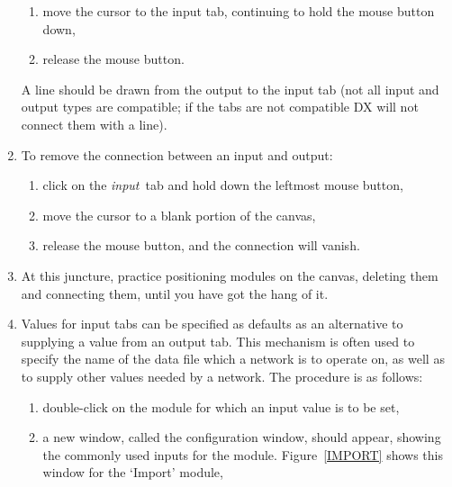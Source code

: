 \documentclass[twoside,11pt]{article}
\begin{document}
\begin{enumerate}
\begin{enumerate}
    \item move the cursor to the input tab, continuing to hold the
     mouse button down,

    \item release the mouse button.

  \end{enumerate}

   A line should be drawn from the output to the input tab (not all
   input and output types are compatible; if the tabs are not compatible
   DX will not connect them with a line).

  \item To remove the connection between an input and output:

  \begin{enumerate}

    \item click on the {\it input}\, tab and hold down the leftmost
     mouse button,

    \item move the cursor to a blank portion of the canvas,

    \item release the mouse button, and the connection will vanish.

  \end{enumerate}

  \item At this juncture, practice positioning modules on the canvas,
   deleting them and connecting them, until you have got the hang of it.

  \item Values for input tabs can be specified as defaults as an
   alternative to supplying a value from an output tab. This mechanism
   is often used to specify the name of the data file which a network
   is to operate on, as well as to supply other values needed by a
   network. The procedure is as follows:

  \begin{enumerate}

    \item double-click on the module for which an input value is to be set,

    \item a new window, called the configuration window, should appear,
     showing the commonly used inputs for the module. Figure~\ref{IMPORT}
     shows this window for the `Import' module,

    \begin{figure}[htbp]


\end{figure}
\end{enumerate}
\end{enumerate}
\end{document}
